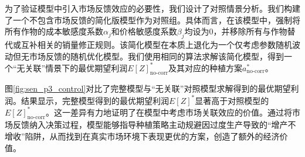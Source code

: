 为了验证模型中引入市场反馈效应的必要性，我们设计了对照情景分析。我们构建了一个不包含市场反馈的简化版模型作为对照组。具体而言，在该模型中，强制将所有作物的成本敏感度系数$\alpha_j$和价格敏感度系数$\beta_j$均设为0，并移除所有与作物替代或互补相关的销量修正规则。该简化模型在本质上退化为一个仅考虑参数随机波动但无市场反馈的随机优化模型。我们使用相同的算法求解该简化模型，得到一个“无关联”情景下的最优期望利润$E[Z]_{\text{no-corr}}^*$及其对应的种植方案$a_{\text{no-corr}}^*$。


图\ref{fig:sen_p3_control}对比了完整模型与“无关联”对照模型求解得到的最优期望利润。结果显示，完整模型得到的最优期望利润$E[Z]^*$显著高于对照模型的$E[Z]_{\text{no-corr}}^*$。这一差异有力地证明了在模型中考虑市场关联效应的价值。通过将市场反馈纳入决策过程，模型能够指导种植策略主动规避因过度生产导致的“增产不增收”陷阱，从而找到在真实市场环境下表现更优的方案，创造了额外的经济价值。